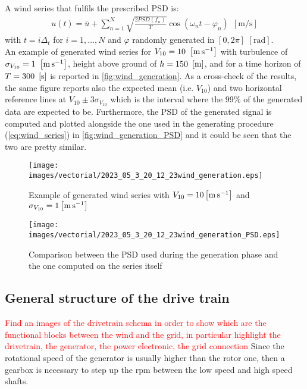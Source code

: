 A wind series that fulfils the prescribed \acrshort{PSD} is:
\begin{gather}
    u(t) = \bar{u}+\sum_{n=1}^{N}\sqrt{\frac{2PSD(f_n)}{T}}\cos{(\omega_nt-\varphi_n)} \ \ \left[\si{\meter \per \second}\right]
    \label{eq:wind_series}
\end{gather}
with $t = i\Delta_t$ for $i=1,\dots,N$ and $\varphi$ randomly generated in $ \left[0, 2\pi\right]$ $\left[\si{\radian}\right]$. \\
An example of generated wind series for $V_{10}=10 \ \left[\si{\meter\per\second}\right]$ with turbulence of $\sigma_{V_{10}}=1 \ \mesunt{\meter\per\second}$, height above ground of $h=150 
 \ \left[\si{\meter}\right]$, and for a time horizon of $T = 300 \ \left[\si{\second}\right]$ is reported in \autoref{fig:wind_generation}. As a cross-check of the results, the same figure reports also the expected mean (i.e. $V_{10}$) and two horizontal reference lines at $V_{10}\pm3\sigma_{V_{10}}$ which is the interval where the 99\% of the generated data are expected to be. Furthermore, the PSD of the generated signal is computed and plotted alongside the one used in the generating procedure (\autoref{eq:wind_series}) in \autoref{fig:wind_generation_PSD} and it could be seen that the two are pretty similar. 
\begin{figure}
    \centering
    \texttt{[image: images/vectorial/2023\_05\_3\_20\_12\_23wind\_generation.eps]}
    \caption{Example of generated wind series with $V_{10}=10\left[\si{\meter\per\second}\right]$ and $\sigma_{V_{10}}=1\left[\si{\meter\per\second}\right]$ }
    \label{fig:wind_generation}
\end{figure}

\begin{figure}
    \centering
    \texttt{[image: images/vectorial/2023\_05\_3\_20\_12\_23wind\_generation\_PSD.eps]}
    \caption{Comparison between the PSD used during the generation phase and the one computed on the series itself}
    \label{fig:wind_generation_PSD}
\end{figure}

\subsection{General structure of the drive train}
\textcolor{red}{Find an images of the drivetrain schema in order to show which are the functional blocks between the wind and the grid, in particular highlight the drivetrain, the generator, the power electronic, the grid connection}
Since the rotational speed of the generator is usually higher than the rotor one, then a gearbox is necessary to step up the rpm between the low speed and high speed shafts.

